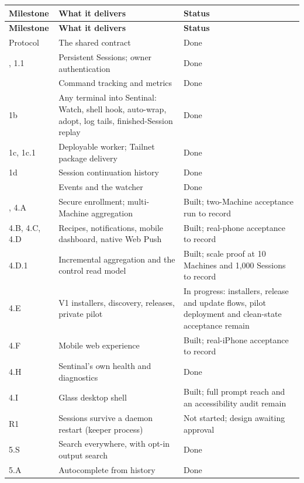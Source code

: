 \begin{small}
\begin{longtable}{>{\raggedright\arraybackslash}p{0.096\dimexpr \linewidth-6\tabcolsep\relax}>{\raggedright\arraybackslash}p{0.452\dimexpr \linewidth-6\tabcolsep\relax}>{\raggedright\arraybackslash}p{0.452\dimexpr \linewidth-6\tabcolsep\relax}}
\toprule
\textbf{Milestone} & \textbf{What it delivers} & \textbf{Status} \\
\midrule
\endfirsthead
\toprule
\textbf{Milestone} & \textbf{What it delivers} & \textbf{Status} \\
\midrule
\endhead
0 Protocol & The shared contract & Done \\
1, 1.1 & Persistent Sessions; owner authentication & Done \\
2 & Command tracking and metrics & Done \\
1b & Any terminal into Sentinal: Watch, shell hook, auto-wrap, adopt, log tails, finished-Session replay & Done \\
1c, 1c.1 & Deployable worker; Tailnet package delivery & Done \\
1d & Session continuation history & Done \\
3 & Events and the watcher & Done \\
4.0, 4.A & Secure enrollment; multi-Machine aggregation & Built; two-Machine acceptance run to record \\
4.B, 4.C, 4.D & Recipes, notifications, mobile dashboard, native Web Push & Built; real-phone acceptance to record \\
4.D.1 & Incremental aggregation and the control read model & Built; scale proof at 10 Machines and 1,000 Sessions to record \\
4.E & V1 installers, discovery, releases, private pilot & In progress: installers, release and update flows, pilot deployment and clean-state acceptance remain \\
4.F & Mobile web experience & Built; real-iPhone acceptance to record \\
4.H & Sentinal's own health and diagnostics & Done \\
4.I & Glass desktop shell & Built; full prompt reach and an accessibility audit remain \\
R1 & Sessions survive a daemon restart (keeper process) & Not started; design awaiting approval \\
5.S & Search everywhere, with opt-in output search & Done \\
5.A & Autocomplete from history & Done \\

\end{longtable}
\end{small}
